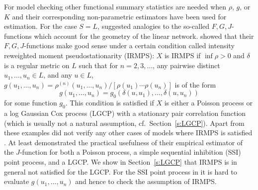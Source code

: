 \documentclass[alpha-refs]{wiley-article}
\begin{document}
For model checking other functional summary statistics are needed when $\rho$, $g$, or $K$ and their corresponding non-parametric estimators have been used for estimation. 
For the case $S=L$, \citet{CronieEtAl} suggested analogies to the so-called $F,G,J$-functions %
% 
\citep[introduced in][when $S=\mathbb R^k$]{Inhom-J-fct} which account for the geometry of the linear network. \citet[][]{CronieEtAl} 
showed that their $F,G,J$-functions make good sense under a certain condition called intensity reweighted moment pseudostationarity
(IRMPS): $X$ is IRMPS if $\inf\rho>0$ and $\delta$ is a regular metric on $L$ such that for $n=2,3,\ldots$, any pairwise distinct $u_1,\ldots,u_n\in L$, and any $u\in L$, $g(u_1,\ldots,u_n)=\rho^{(n)}(u_1,\ldots,u_n)/[\rho(u_1)\cdots\rho(u_n)]$ is of the form
\begin{equation}\label{e:IRMPS}
g(u_1,\ldots,u_n)=g_0(\delta(u,u_1),\ldots,\delta(u,u_n))
\end{equation}
for some function $g_0$. This condition is satisfied if  $X$ is either  a Poisson process or  %
 a log Gaussian Cox process (LGCP) with a stationary pair correlation function (which is usually not a natural assumption, cf.\ Section~\ref{s:LGCP}). Apart from these examples 
\citet[][]{CronieEtAl} did not %
 verify any other cases of models where IRMPS is satisfied \citep[in Section~\ref{s:LGCP} we correct some mistakes in][]{CronieEtAl}. At least
\citet[][]{CronieEtAl} demonstrated %
the practical usefulness of their empirical estimator of the $J$-function for both a Poisson process, a simple
sequential inhibition (SSI) point process, and a LGCP. We show in Section~\ref{s:LGCP} that IRMPS is in general not satisfied for the LGCP. For the SSI point process in \citet[][]{CronieEtAl} it is hard to evaluate $g(u_1,\ldots,u_n)$ and hence to check the assumption of IRMPS. 
\end{document}
